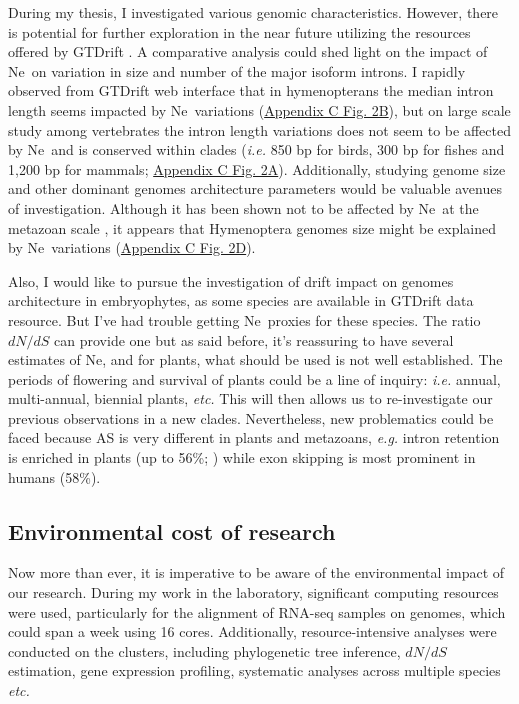 During my thesis, I investigated various genomic characteristics. However, there is potential for further exploration in the near future utilizing the resources offered by GTDrift \citep{benitiere_gtdrift_2024}. A comparative analysis could shed light on the impact of \acrshort{Ne}~on variation in size and number of the major isoform introns. I rapidly observed from GTDrift web interface that in hymenopterans the median intron length seems impacted by \acrshort{Ne}~variations (\hyperref[suppfig:AppC2]{Appendix C Fig. 2B}), but on large scale study among vertebrates the intron length variations does not seem to be affected by \acrshort{Ne}~and is conserved within clades (\textit{i.e.} 850 \acrshort{bp} for birds, 300 \acrshort{bp} for fishes and 1,200 \acrshort{bp} for mammals; \hyperref[suppfig:AppC2]{Appendix C Fig. 2A}). Additionally, studying genome size and other dominant genomes architecture parameters would be valuable avenues of investigation. Although it has been shown not to be affected by \acrshort{Ne}~at the metazoan scale \citep{whitney_did_2010, roddy_mammals_2021, marino_effective_2024}, it appears that Hymenoptera genomes size might be explained by \acrshort{Ne}~variations (\hyperref[suppfig:AppC2]{Appendix C Fig. 2D}).

Also, I would like to pursue the investigation of drift impact on genomes architecture in embryophytes, as some species are available in GTDrift data resource.
But I've had trouble getting \acrshort{Ne}~proxies for these species. The ratio $dN/dS$ can provide one but as said before, it's reassuring to have several estimates of \acrshort{Ne}, and for plants, what should be used is not well established. The periods of flowering and survival of plants could be a line of inquiry: \textit{i.e.} annual, multi-annual, biennial plants, \textit{etc.} This will then allows us to re-investigate our previous observations in a new clades. Nevertheless, new problematics could be faced because \acrshort{AS} is very different in plants and metazoans, \textit{e.g.} intron retention is enriched in plants (up to 56\%; \citet{reddy_deciphering_2012, reddy_complexity_2013}) while exon skipping is most prominent in humans (58\%).

\subsection{Environmental cost of research}

Now more than ever, it is imperative to be aware of the environmental impact of our research. During my work in the laboratory, significant computing resources were used, particularly for the alignment of RNA-seq samples on genomes, which could span a week using 16 cores. Additionally, resource-intensive analyses were conducted on the clusters, including phylogenetic tree inference, $dN/dS$ estimation, gene expression profiling, systematic analyses across multiple species \textit{etc.}

